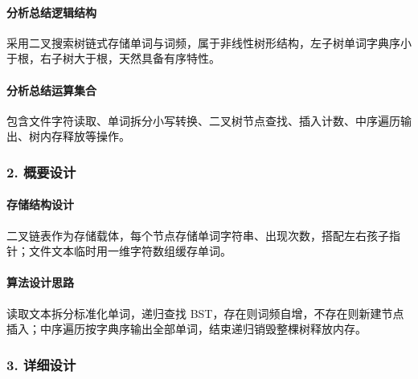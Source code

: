 \documentclass{ctexart}
\begin{document}
\paragraph{分析总结逻辑结构}
采用二叉搜索树链式存储单词与词频，属于非线性树形结构，左子树单词字典序小于根，右子树大于根，天然具备有序特性。
\paragraph{分析总结运算集合}
包含文件字符读取、单词拆分小写转换、二叉树节点查找、插入计数、中序遍历输出、树内存释放等操作。
\subsubsection{2. 概要设计}
\paragraph{存储结构设计}
二叉链表作为存储载体，每个节点存储单词字符串、出现次数，搭配左右孩子指针；文件文本临时用一维字符数组缓存单词。
\paragraph{算法设计思路}
读取文本拆分标准化单词，递归查找 BST，存在则词频自增，不存在则新建节点插入；中序遍历按字典序输出全部单词，结束递归销毁整棵树释放内存。
\subsubsection{3. 详细设计}
\end{document}
